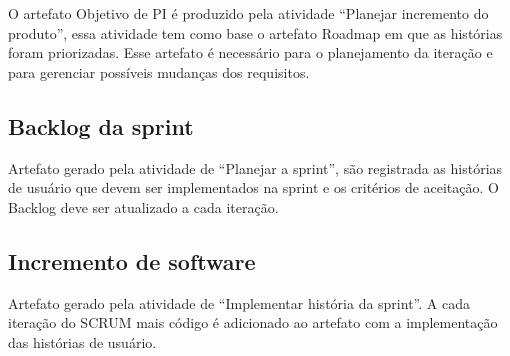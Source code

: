   O artefato Objetivo de PI  é produzido pela atividade “Planejar incremento do produto”, essa atividade tem como base o artefato Roadmap em que as histórias foram priorizadas.
  Esse artefato é necessário para o planejamento da iteração e para gerenciar possíveis mudanças dos requisitos.

\subsection {Backlog da sprint}

  Artefato gerado pela atividade de “Planejar a sprint”, são registrada as histórias de usuário que devem ser implementados na sprint e os critérios de aceitação. O Backlog deve ser atualizado a cada iteração.

\subsection {Incremento de software}
  
  Artefato gerado pela atividade de “Implementar história da sprint”. A cada iteração do SCRUM mais código é adicionado ao artefato com a implementação das histórias de usuário.